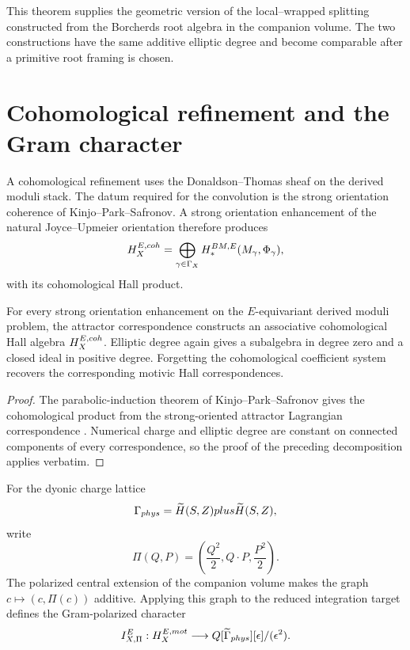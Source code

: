 This theorem supplies the geometric version of the local--wrapped splitting constructed from the Borcherds root algebra in the companion volume.  The two constructions have the same additive elliptic degree and become comparable after a primitive root framing is chosen.

\chapter{Cohomological refinement and the Gram character}
A cohomological refinement uses the Donaldson--Thomas sheaf on the derived moduli stack.  The datum required for the convolution is the strong orientation coherence of Kinjo--Park--Safronov.  A strong orientation enhancement of the natural Joyce--Upmeier orientation therefore produces
\[
 H_X^{E,coh}
 =\bigoplus_{\gamma\in\Gamma_X}
 H_*^{BM,E}(M_\gamma,\Phi_\gamma),
\]
with its cohomological Hall product.

\begin{theorem}
For every strong orientation enhancement on the $E$-equivariant derived moduli problem, the attractor correspondence constructs an associative cohomological Hall algebra $H_X^{E,coh}$.  Elliptic degree again gives a subalgebra in degree zero and a closed ideal in positive degree.  Forgetting the cohomological coefficient system recovers the corresponding motivic Hall correspondences.
\end{theorem}
\begin{proof}
The parabolic-induction theorem of Kinjo--Park--Safronov gives the cohomological product from the strong-oriented attractor Lagrangian correspondence \cite{KPS}.  Numerical charge and elliptic degree are constant on connected components of every correspondence, so the proof of the preceding decomposition applies verbatim.
\end{proof}

For the dyonic charge lattice
\[
 \Gamma_{phys}
 =\widetilde H(S,Z)plus\widetilde H(S,Z),
\]
write
\[
 \Pi(Q,P)=\left(\frac{Q^2}{2},Q\cdot P,\frac{P^2}{2}\right).
\]
The polarized central extension of the companion volume makes the graph $c\mapsto(c,\Pi(c))$ additive.  Applying this graph to the reduced integration target defines the Gram-polarized character
\[
 I_{X,\Pi}^E:
 H_X^{E,mot}
 \longrightarrow
 Q[\widetilde\Gamma_{phys}][\epsilon]/(\epsilon^2).
\]

